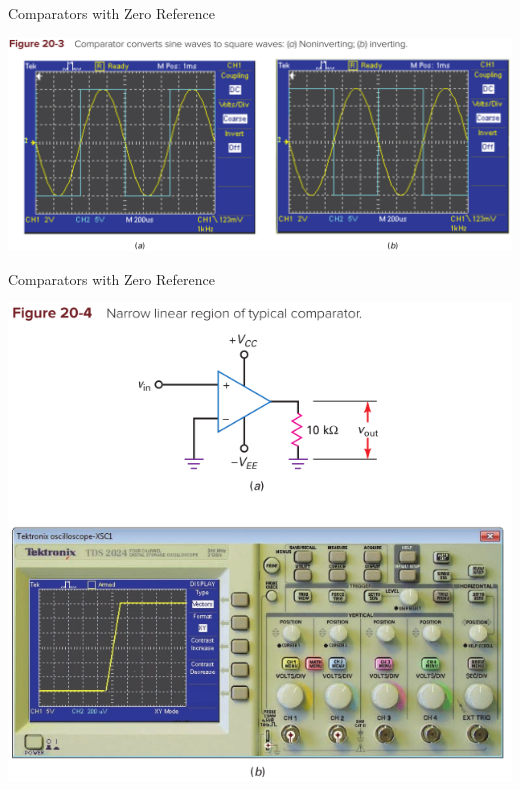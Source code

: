 \documentclass[pdflatex,compress]{beamer}
\begin{document}
\begin{frame}{Comparators with Zero Reference}
	\begin{center}
		\includegraphics[width=1\linewidth]{img/2003}
	\end{center}
\end{frame}

\begin{frame}{Comparators with Zero Reference}
	\begin{center}
		\includegraphics[height=0.9\textheight]{img/2004}
	\end{center}
\end{frame}
\end{document}
